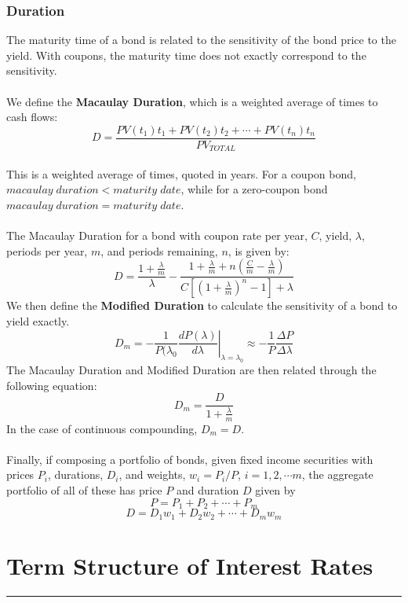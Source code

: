 \documentclass[11pt]{article}
\begin{document}
\subsubsection{Duration}
The maturity time of a bond is related to the sensitivity of the bond price to the yield. With coupons, the maturity time does not exactly correspond to the sensitivity.  \\ \\ We define the \textbf{Macaulay Duration}, which is a weighted average of times to cash flows: \\ \smallskip
$$ D = \frac{PV(t_1)t_1 + PV(t_2)t_2 + \cdots + PV(t_n)t_n  }{PV_{TOTAL}} $$ 
\\
This is a weighted average of times, quoted in years.  For a coupon bond, $macaulay \; duration < maturity \; date$, while for a zero-coupon bond $macaulay \; duration = maturity \; date$.  \\ \\
The Macaulay Duration for a bond with coupon rate per year, $C$, yield, $\lambda$,  periods per year, $m$, and periods remaining, $n$, is given by:
$$D = \frac{1+ \frac{\lambda}{m}}{ \lambda} - \frac{1+\frac{\lambda}{m} + n (\frac{C}{m} - \frac{\lambda}{m}
)}{C[(1+\frac{\lambda}{m})^n -1] + \lambda} $$ 
We then define the \textbf{Modified Duration} to calculate the sensitivity of a bond to yield exactly. $$D_m = - \frac{1}{P(\lambda_0} \left. \frac{dP(\lambda)}{d\lambda} \right|_{\lambda=\lambda_0} \approx - \frac{1}{P} \frac{\Delta P}{\Delta \lambda}$$ 
The Macaulay Duration and Modified Duration are then related through the following equation: 
$$ D_m = \frac{D}{1+\frac{\lambda}{m}}$$
In the case of continuous compounding, $D_m = D$. \\ \\
Finally, if composing a portfolio of bonds, given fixed income securities with prices $P_i$,  durations, $D_i$,  and weights,  $w_i = P_i / P$,  $i = 1,2, \cdots m$, the aggregate portfolio of all of these has price $P$ and duration $D$ given by
$$ P = P_1 + P_2 + \cdots + P_m$$ 
$$ D = D_1w_1 +D_2 w_2+ \cdots + D_mw_m$$ 

\pagebreak

\section{Term Structure of Interest Rates}
\hrule \vspace{15pt}
\end{document}

